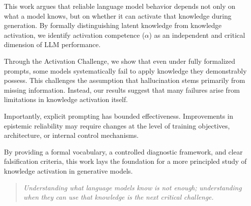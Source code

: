 \documentclass[11pt,a4paper]{article}
\begin{document}
This work argues that reliable language model behavior depends not only on what a model knows, but on whether it can activate that knowledge during generation. By formally distinguishing latent knowledge from knowledge activation, we identify activation competence ($\alpha$) as an independent and critical dimension of LLM performance.

Through the Activation Challenge, we show that even under fully formalized prompts, some models systematically fail to apply knowledge they demonstrably possess. This challenges the assumption that hallucination stems primarily from missing information. Instead, our results suggest that many failures arise from limitations in knowledge activation itself.

Importantly, explicit prompting has bounded effectiveness. Improvements in epistemic reliability may require changes at the level of training objectives, architecture, or internal control mechanisms.

By providing a formal vocabulary, a controlled diagnostic framework, and clear falsification criteria, this work lays the foundation for a more principled study of knowledge activation in generative models.

\vspace{0.5em}
\begin{quote}
\textit{Understanding what language models know is not enough; understanding when they can use that knowledge is the next critical challenge.}
\end{quote}








\clearpage

\end{document}
